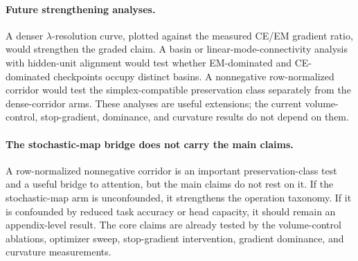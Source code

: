 \paragraph{Future strengthening analyses.}
A denser $\lambda$-resolution curve, plotted against the measured CE/EM
gradient ratio, would strengthen the graded claim. A basin or
linear-mode-connectivity analysis with hidden-unit alignment would test
whether EM-dominated and CE-dominated checkpoints occupy distinct basins. A
nonnegative row-normalized corridor would test the simplex-compatible
preservation class separately from the dense-corridor arms. These analyses are
useful extensions; the current volume-control, stop-gradient, dominance, and
curvature results do not depend on them.

\paragraph{The stochastic-map bridge does not carry the main claims.}
A row-normalized nonnegative corridor is an important preservation-class test
and a useful bridge to attention, but the main claims do not rest on it. If
the stochastic-map arm is unconfounded, it strengthens the operation taxonomy.
If it is confounded by reduced task accuracy or head capacity, it should
remain an appendix-level result. The core claims are already tested by the
volume-control ablations, optimizer sweep, stop-gradient intervention,
gradient dominance, and curvature measurements.